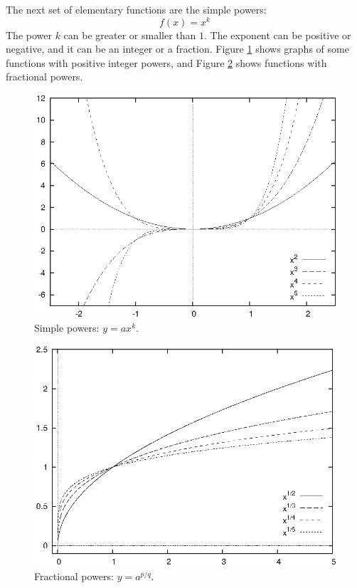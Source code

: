 The next set of elementary functions are the simple powers:
%
\[
f(x) = x^k
\]
%
The power $k$ can be greater or smaller than $1$. The exponent can be
positive or negative, and it can be an integer or a fraction.  Figure
\ref{fig:powers} shows graphs of some functions with positive integer
powers, and Figure \ref{fig:fracpowers} shows functions with
fractional powers.

\begin{figure}
  \centerline{\includegraphics{img/powers}}
  \caption{Simple powers: $y = ax^k$.}
  \label{fig:powers}
\end{figure}

\begin{figure}
  \centerline{\includegraphics{img/fracpowers}}
  \caption{Fractional powers: $y = a^{p/q}$.}
  \label{fig:fracpowers}\vspace*{-12pt}
\end{figure}

